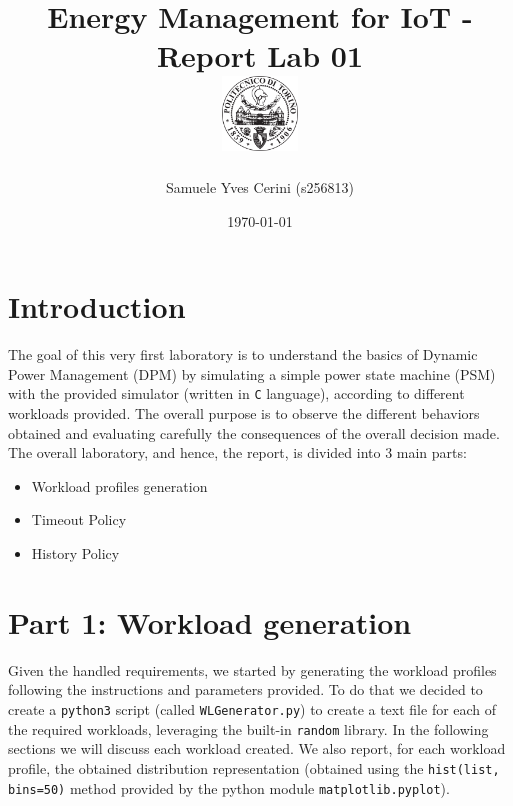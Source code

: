 \documentclass[a4paper]{article}
\begin{document}
    \title{
        Energy Management for IoT - Report Lab 01 \\[0.5cm]
        \includegraphics[width=0.15\textwidth]{PoliLogo.png}%
    }
    \author{Samuele Yves Cerini (s256813)}
    \date{\today}
    \maketitle

    \tableofcontents

%
\section{Introduction}
    The goal of this very first laboratory is to understand the basics of Dynamic Power Management (DPM) by simulating a simple power state machine (PSM) with the provided simulator (written in \texttt{C} language), according to different workloads provided. The overall purpose is to observe the different behaviors obtained and evaluating carefully the consequences of the overall decision made. The overall laboratory, and hence, the report, is divided into 3 main parts:
    \begin{itemize}
        \item Workload profiles generation
        \item Timeout Policy
        \item History Policy
    \end{itemize}

%
\section{Part 1: Workload generation}
    Given the handled requirements, we started by generating the workload profiles following the instructions and parameters provided. To do that we decided to create a \texttt{python3} script (called \texttt{WLGenerator.py}) to create a text file for each of the required workloads, leveraging the built-in \texttt{random} library. In the following sections we will discuss each workload created. We also report, for each workload profile, the obtained distribution representation (obtained using the \texttt{hist(list, bins=50)} method provided by the python module \texttt{matplotlib.pyplot}).
\end{document}
